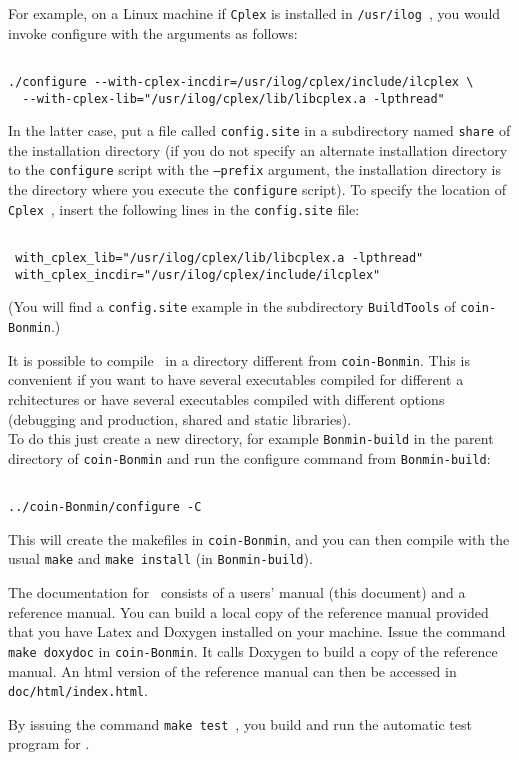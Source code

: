 For example, on a Linux machine if {\tt Cplex} is installed in {\tt /usr/ilog}~, you would
invoke configure with the arguments as follows:
\begin{verbatim}

./configure --with-cplex-incdir=/usr/ilog/cplex/include/ilcplex \
  --with-cplex-lib="/usr/ilog/cplex/lib/libcplex.a -lpthread"
 \end{verbatim}
In the latter case, put a file called {\tt config.site} in a subdirectory named
{\tt share} of the installation directory (if you do not specify an alternate
installation directory to the {\tt configure} script with the {\tt --prefix}
argument, the installation directory is the directory where you execute the
{\tt configure} script). To specify the location of {\tt Cplex}~, insert the
following lines in the {\tt config.site} file:
 \begin{verbatim}

 with_cplex_lib="/usr/ilog/cplex/lib/libcplex.a -lpthread"
 with_cplex_incdir="/usr/ilog/cplex/include/ilcplex"
 \end{verbatim}
 (You will find a {\tt config.site} example in the subdirectory {\tt BuildTools} of {\tt coin-Bonmin}.)

It is possible to compile \Bonmin\ in a directory different from {\tt coin-Bonmin}.
This is convenient if you want to have several executables compiled for different a
rchitectures or have several executables compiled with different options
(debugging and production, shared and static libraries).\\

To do this just create a new directory, for example {\tt Bonmin-build} in the parent directory of
{\tt coin-Bonmin} and run the configure command from {\tt Bonmin-build}:
\begin{verbatim}

../coin-Bonmin/configure -C

\end{verbatim}
This will create the makefiles in {\tt coin-Bonmin}, and
you can then compile with the usual {\tt make} and {\tt make install}
(in {\tt Bonmin-build}).

The documentation for \Bonmin\ consists of a users' manual (this document) and a reference manual.
You can build a local copy of the reference manual provided that you have Latex
and Doxygen installed on your machine. Issue the command {\tt make
doxydoc} in {\tt coin-Bonmin}. It calls Doxygen to build a copy of the
reference manual. An html version of the reference manual can then
be accessed in {\tt doc/html/index.html}.


By issuing the command {\tt make test}~, you build and run the automatic test program for \Bonmin.
